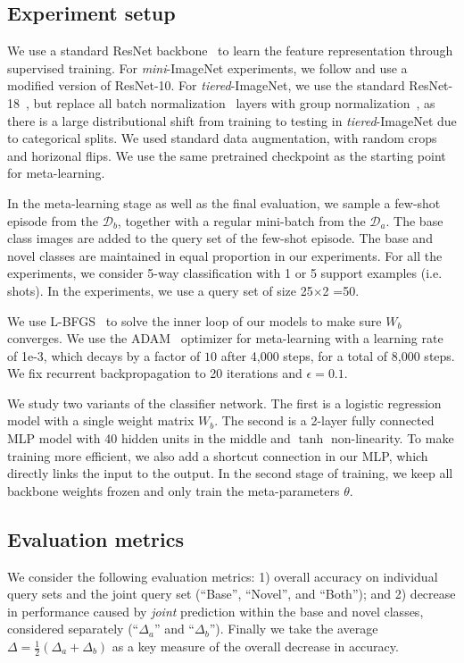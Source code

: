 


\subsection{Experiment setup}
We use a standard ResNet backbone~\citep{resnet} to learn the feature representation through
supervised training. For \textit{mini}-ImageNet experiments, we follow \citet{mishra2017meta} and use
a modified version of ResNet-10. For \textit{tiered}-ImageNet, we use the standard ResNet-18~\citep{resnet}, but replace all batch normalization~\citep{batchnorm} layers with group
normalization~\citep{groupnorm}, as there is a large distributional shift from training to testing
in \textit{tiered}-ImageNet due to categorical splits. We used standard data augmentation, with
random crops and horizonal flips. We use the same pretrained checkpoint as the starting
point for meta-learning.

In the meta-learning stage as well as the final evaluation, we sample a few-shot episode from the
$\mathcal{D}_b$, together with a regular mini-batch from the $\mathcal{D}_a$. The base class images
are added to the query set of the few-shot episode. The base and novel classes are maintained in
equal proportion in our experiments. For all the experiments, we consider 5-way classification with
1 or 5 support examples (i.e. shots). In the experiments, we use a query set of size 25$\times$2
=50.

We use L-BFGS~\citep{zhu1997algorithm} to solve the inner loop of our models to make sure $W_b$
converges. We use the ADAM~\citep{kingma2014adam} optimizer for meta-learning with a learning rate
of 1e-3, which decays by a factor of $10$ after 4,000 steps, for a total of 8,000 steps. We fix
recurrent backpropagation to 20 iterations and $\epsilon=0.1$.

We study two variants of the classifier network. The first is a logistic
regression model with a single weight matrix $W_b$. The second is a 2-layer fully connected MLP model
with 40 hidden units in the middle and $\tanh$ non-linearity. To make training more efficient, we
also add a shortcut connection in our MLP, which directly links the input to the output. In the
second stage of training, we keep all backbone weights frozen and only train the meta-parameters
$\theta$.

\subsection{Evaluation metrics}
We consider the following evaluation metrics:
1) overall accuracy on individual query sets and the joint query set (``Base'', ``Novel'', and
   ``Both''); and
2) decrease in performance caused by  \emph{joint} prediction within the base and novel classes,
   considered separately (``$\Delta_a$'' and ``$\Delta_b$''). Finally we take the average $\Delta =
   \frac{1}{2} (\Delta_a+\Delta_b)$ as a key measure of the overall decrease in accuracy.


